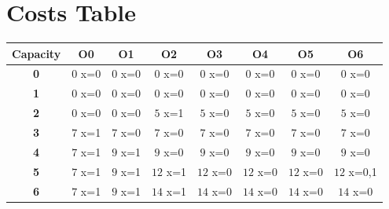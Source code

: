 \documentclass{article}
\begin{document}
\section{Costs Table}
\begin{center}
    \begin{tabular}{|c||c|c|c|c|c|c|c|}
        \hline
        \textbf{Capacity} & \textbf{O0} & \textbf{O1} & \textbf{O2} & \textbf{O3} & \textbf{O4} & \textbf{O5} & \textbf{O6} \\
        \hline
        \hline
        \textbf{0}& \cellcolor[HTML]{FC3F3F}$0$ x={0}& \cellcolor[HTML]{FC3F3F}$0$ x={0}& \cellcolor[HTML]{FC3F3F}$0$ x={0}& \cellcolor[HTML]{FC3F3F}$0$ x={0}& \cellcolor[HTML]{FC3F3F}$0$ x={0}& \cellcolor[HTML]{FC3F3F}$0$ x={0}& \cellcolor[HTML]{FC3F3F}$0$ x={0}\\
        \hline
        \textbf{1}& \cellcolor[HTML]{FC3F3F}$0$ x={0}& \cellcolor[HTML]{FC3F3F}$0$ x={0}& \cellcolor[HTML]{FC3F3F}$0$ x={0}& \cellcolor[HTML]{FC3F3F}$0$ x={0}& \cellcolor[HTML]{FC3F3F}$0$ x={0}& \cellcolor[HTML]{FC3F3F}$0$ x={0}& \cellcolor[HTML]{FC3F3F}$0$ x={0}\\
        \hline
        \textbf{2}& \cellcolor[HTML]{FC3F3F}$0$ x={0}& \cellcolor[HTML]{FC3F3F}$0$ x={0}& \cellcolor[HTML]{3FFC45}$5$ x={1} & \cellcolor[HTML]{FC3F3F}$5$ x={0}& \cellcolor[HTML]{FC3F3F}$5$ x={0}& \cellcolor[HTML]{FC3F3F}$5$ x={0}& \cellcolor[HTML]{FC3F3F}$5$ x={0}\\
        \hline
        \textbf{3}& \cellcolor[HTML]{3FFC45}$7$ x={1} & \cellcolor[HTML]{FC3F3F}$7$ x={0}& \cellcolor[HTML]{FC3F3F}$7$ x={0}& \cellcolor[HTML]{FC3F3F}$7$ x={0}& \cellcolor[HTML]{FC3F3F}$7$ x={0}& \cellcolor[HTML]{FC3F3F}$7$ x={0}& \cellcolor[HTML]{FC3F3F}$7$ x={0}\\
        \hline
        \textbf{4}& \cellcolor[HTML]{3FFC45}$7$ x={1} & \cellcolor[HTML]{3FFC45}$9$ x={1} & \cellcolor[HTML]{FC3F3F}$9$ x={0}& \cellcolor[HTML]{FC3F3F}$9$ x={0}& \cellcolor[HTML]{FC3F3F}$9$ x={0}& \cellcolor[HTML]{FC3F3F}$9$ x={0}& \cellcolor[HTML]{FC3F3F}$9$ x={0}\\
        \hline
        \textbf{5}& \cellcolor[HTML]{3FFC45}$7$ x={1} & \cellcolor[HTML]{3FFC45}$9$ x={1} & \cellcolor[HTML]{3FFC45}$12$ x={1} & \cellcolor[HTML]{FC3F3F}$12$ x={0}& \cellcolor[HTML]{FC3F3F}$12$ x={0}& \cellcolor[HTML]{FC3F3F}$12$ x={0}& \cellcolor[HTML]{3F62FC}$12$ x={0,1}\\
        \hline
        \textbf{6}& \cellcolor[HTML]{3FFC45}$7$ x={1} & \cellcolor[HTML]{3FFC45}$9$ x={1} & \cellcolor[HTML]{3FFC45}$14$ x={1} & \cellcolor[HTML]{FC3F3F}$14$ x={0}& \cellcolor[HTML]{FC3F3F}$14$ x={0}& \cellcolor[HTML]{FC3F3F}$14$ x={0}& \cellcolor[HTML]{FC3F3F}$14$ x={0}\\

\end{tabular}
\end{center}
\end{document}
